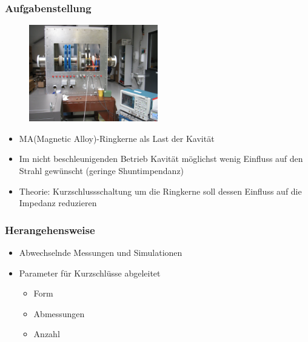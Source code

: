 \documentclass[accentcolor=tud9b, colorbacktitle, inverttitle]{tudbeamer}
\begin{document}
\begin{frame}\frametitle{Aufgabenstellung}
\vspace{-1em}
\begin{multicols}{2}
	\begin{figure}[h]
		\centering
		\includegraphics[width=0.5\textwidth]{Kavitaet}
	\end{figure}
	\vfill\null
	\columnbreak
	\begin{itemize}
		\item MA(Magnetic Alloy)-Ringkerne als Last der Kavit\"at
		\item Im nicht beschleunigenden Betrieb Kavit\"at m\"oglichst wenig Einfluss auf den Strahl gewünscht (geringe Shuntimpendanz)
		\item Theorie: Kurzschlussschaltung um die Ringkerne soll dessen Einfluss auf die Impedanz reduzieren
	\end{itemize}
\end{multicols}
\end{frame}


\begin{frame}\frametitle{Herangehensweise}
\begin{itemize}
	\item Abwechselnde Messungen und Simulationen
	\item Parameter f\"ur Kurzschl\"usse abgeleitet
	\begin{itemize}
		\item Form
		\item Abmessungen
		\item Anzahl
	\end{itemize}
\end{itemize}
\end{frame}
\end{document}

